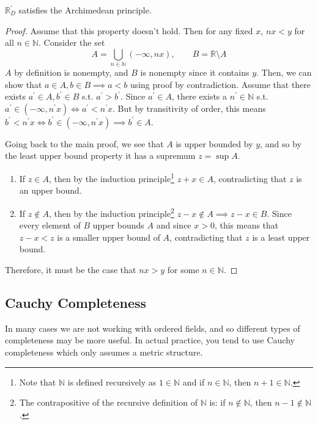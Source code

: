  \begin{theorem}
    $\mathbb{R}_D^\prime$ satisfies the Archimedean principle. 
  \end{theorem}
  \begin{proof}
    Assume that this property doesn't hold. Then for any fixed $x$, $nx < y$ for all $n \in \mathbb{N}$. Consider the set 
    \begin{equation}
      A = \bigcup_{n \in \mathbb{N}} (-\infty, nx), \qquad B = \mathbb{R} \setminus A
    \end{equation}
    $A$ by definition is nonempty, and $B$ is nonempty since it contains $y$. Then, we can show that $a \in A, b \in B \implies a < b$ using proof by contradiction. Assume that there exists $a^\prime \in A, b^\prime \in B$ s.t. $a^\prime > b^\prime$. Since $a^\prime \in A$, there exists a $n^\prime \in \mathbb{N}$ s.t. $a^\prime \in (-\infty, n^\prime x) \iff a^\prime < n^\prime x$. But by transitivity of order, this means $b^\prime < n^\prime x \iff b^\prime \in (-\infty, n^\prime x) \implies b^\prime \in A$. 

    Going back to the main proof, we see that $A$ is upper bounded by $y$, and so by the least upper bound property it has a supremum $z = \sup{A}$. 
    \begin{enumerate}
      \item If $z \in A$, then by the induction principle\footnote{Note that $\mathbb{N}$ is defined recursively as $1 \in \mathbb{N}$ and if $n \in \mathbb{N}$, then $n+1 \in \mathbb{N}$. } $z + x \in A$, contradicting that $z$ is an upper bound. 
      \item If $z \not\in A$, then by the induction principle\footnote{The contrapositive of the recursive definition of $\mathbb{N}$ is: if $n \not\in \mathbb{N}$, then $n-1 \not\in \mathbb{N}$.} $z-x \not\in A \implies z-x \in B$. Since every element of $B$ upper bounds $A$ and since $x > 0$, this means that $z-x < z$ is a smaller upper bound of $A$, contradicting that $z$ is a least upper bound. 
    \end{enumerate}
    Therefore, it must be the case that $nx > y$ for some $n \in \mathbb{N}$. 
  \end{proof}

\subsection{Cauchy Completeness} 

  In many cases we are not working with ordered fields, and so different types of completeness may be more useful. In actual practice, you tend to use Cauchy completeness which only assumes a metric structure. 

